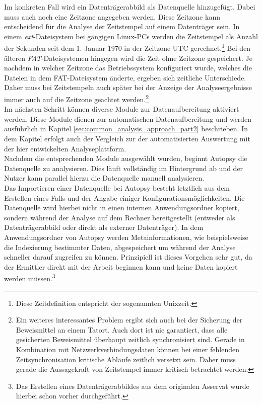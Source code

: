 \noindent
Im konkreten Fall wird ein Datenträgerabbild als Datenquelle hinzugefügt. Dabei muss auch noch eine Zeitzone angegeben werden. Diese Zeitzone kann entscheidend für die Analyse der Zeitstempel auf einem Datenträger sein. In einem \textit{ext}-Dateisystem bei gängigen Linux-PCs werden die Zeitstempel als Anzahl der Sekunden seit dem 1. Januar 1970 in der Zeitzone UTC gerechnet.\cite[S. 326]{filesystem_forensic}\footnote{Diese Zeitdefinition entspricht der sogenannten Unixzeit.} Bei den älteren \textit{FAT}-Dateisystemen hingegen wird die Zeit ohne Zeitzone gespeichert.\cite[S. 192-194]{filesystem_forensic} Je nachdem in welcher Zeitzone das Betriebssystem konfiguriert wurde, welches die Dateien in dem FAT-Dateisystem änderte, ergeben sich zeitliche Unterschiede. Daher muss bei Zeitstempeln auch später bei der Anzeige der Analyseergebnisse immer auch auf die Zeitzone geachtet werden.\footnote{Ein weiteres interessantes Problem ergibt sich auch bei der Sicherung der Beweismittel an einem Tatort. Auch dort ist nie garantiert, dass alle gesicherten Beweismittel überhaupt zeitlich synchronisiert sind. Gerade in Kombination mit Netzwerkverbindungsdaten können bei einer fehlenden Zeitsynchronisation kritische Abläufe zeitlich versetzt sein. Daher muss gerade die Aussagekraft von Zeitstempel immer kritisch betrachtet werden.}\\

\noindent
Im nächsten Schritt können diverse Module zur Datenaufbereitung aktiviert werden. Diese Module dienen zur automatischen Datenaufbereitung und werden ausführlich in Kapitel \ref{sec:common_analysis_approach_part2} beschrieben. In dem Kapitel erfolgt auch der Vergleich zur der automatisierten Auswertung mit der hier entwickelten Analyseplattform.\\
Nachdem die entsprechenden Module ausgewählt wurden, beginnt Autopsy die Datenquelle zu analysieren. Dies läuft vollständig im Hintergrund ab und der Nutzer kann parallel hierzu die Datenquelle manuell analysieren.\\ 

\noindent
Das Importieren einer Datenquelle bei Autopsy besteht letztlich aus dem Erstellen eines Falls und der Angabe einiger Konfigurationsmöglichkeiten. Die Datenquelle wird hierbei nicht in einen internen Anwendungsordner kopiert, sondern während der Analyse auf dem Rechner bereitgestellt (entweder als Datenträgerabbild oder direkt als externer Datenträger). 
In dem Anwendungsordner von Autopsy werden Metainformationen, wie beispielsweise die Indexierung bestimmter Daten, abgespeichert um während der Analyse schneller darauf zugreifen zu können. Prinzipiell ist dieses Vorgehen sehr gut, da der Ermittler direkt mit der Arbeit beginnen kann und keine Daten kopiert werden müssen.\footnote{Das Erstellen eines Datenträgerabbildes aus dem originalen Asservat wurde hierbei schon vorher durchgeführt.}


